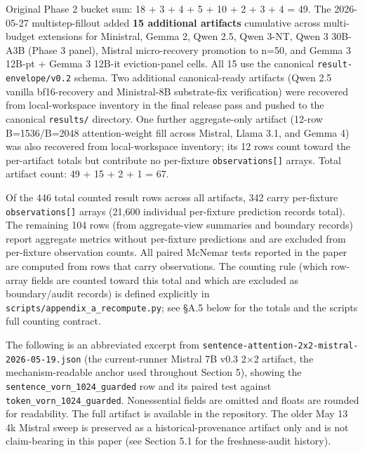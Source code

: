 \documentclass[10pt]{article}
\begin{document}
Original Phase 2 bucket sum: 18 + 3 + 4 + 5 + 10 + 2 + 3 + 4 = 49. The
2026-05-27 multistep-fillout added
\textbf{15 additional artifacts} cumulative across multi-budget
extensions for Ministral, Gemma 2, Qwen 2.5, Qwen 3-NT, Qwen 3 30B-A3B
(Phase 3 panel), Mistral micro-recovery promotion to n=50, and
Gemma 3 12B-pt + Gemma 3 12B-it eviction-panel cells. All 15 use the
canonical \texttt{result-envelope/v0.2} schema. Two additional
canonical-ready artifacts (Qwen 2.5 vanilla bf16-recovery and
Ministral-8B substrate-fix verification) were recovered from
local-workspace inventory in the final release pass and pushed to
the canonical \texttt{results/} directory. One further aggregate-only
artifact (12-row B=1536/B=2048 attention-weight fill across Mistral,
Llama 3.1, and Gemma 4) was also recovered from local-workspace
inventory; its 12 rows count toward the per-artifact totals but
contribute no per-fixture \texttt{observations{[}{]}} arrays. Total
artifact count: 49 + 15 + 2 + 1 = 67.

Of the 446 total counted result rows across all artifacts, 342 carry
per-fixture \texttt{observations{[}{]}} arrays (21,600 individual
per-fixture prediction records total). The remaining 104 rows (from
aggregate-view summaries and boundary records) report aggregate metrics
without per-fixture predictions and are excluded from per-fixture
observation counts. All paired McNemar tests reported in the paper are computed
from rows that carry observations. The counting rule (which row-array
fields are counted toward this total and which are excluded as
boundary/audit records) is defined explicitly in
\texttt{scripts/\allowbreak{}appendix\_a\_recompute.\allowbreak{}py}; see \S{}A.5 below for the
totals and the script\textquotesingle s full counting contract.

The following is an abbreviated excerpt from
\texttt{sentence-attention-2x2-mistral-2026-05-19.\allowbreak{}json} (the
current-runner Mistral 7B v0.3 2$\times$2 artifact, the mechanism-readable
anchor used throughout Section 5), showing the
\texttt{sentence\_vorn\_1024\_guarded} row and its paired test against
\texttt{token\_vorn\_1024\_guarded}. Nonessential fields are omitted and
floats are rounded for readability. The full artifact is available in
the repository. The older May 13 4k Mistral sweep is preserved as a
historical-provenance artifact only and is not claim-bearing in this
paper (see Section 5.1 for the freshness-audit history).
\end{document}
